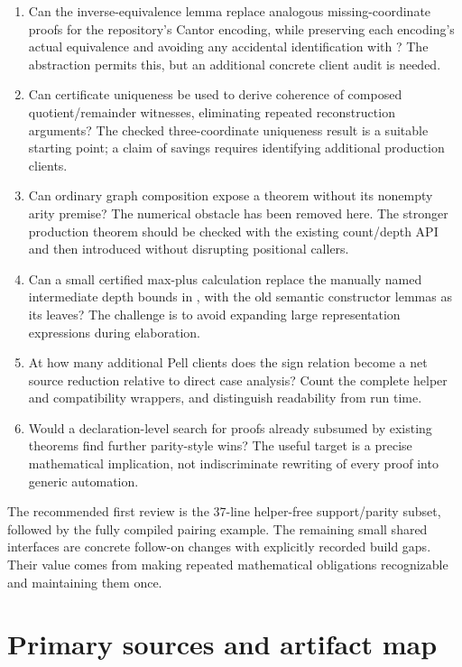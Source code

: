 \documentclass[11pt,letterpaper]{article}
\newcommand{\code}[1]{\texttt{\detokenize{#1}}}
\begin{document}
\begin{enumerate}
\item Can the inverse-equivalence lemma replace analogous missing-coordinate
proofs for the repository's Cantor encoding, while preserving each encoding's
actual equivalence and avoiding any accidental identification with
\code{Nat.pair}? The abstraction permits this, but an additional concrete
client audit is needed.
\item Can certificate uniqueness be used to derive coherence of composed
quotient/remainder witnesses, eliminating repeated reconstruction arguments?
The checked three-coordinate uniqueness result is a suitable starting point;
a claim of savings requires identifying additional production clients.
\item Can ordinary graph composition expose a theorem without its nonempty
arity premise? The numerical obstacle has been removed here. The stronger
production theorem should be checked with the existing count/depth API and
then introduced without disrupting positional callers.
\item Can a small certified max-plus calculation replace the manually named
intermediate depth bounds in \code{BoundedForallDepth}, with the old semantic
constructor lemmas as its leaves? The challenge is to avoid expanding large
representation expressions during elaboration.
\item At how many additional Pell clients does the sign relation become a
net source reduction relative to direct case analysis? Count the complete
helper and compatibility wrappers, and distinguish readability from run time.
\item Would a declaration-level search for proofs already subsumed by existing
theorems find further parity-style wins? The useful target is a precise
mathematical implication, not indiscriminate rewriting of every proof into
generic automation.
\end{enumerate}

The recommended first review is the 37-line helper-free support/parity subset,
followed by the fully compiled pairing example. The remaining small shared
interfaces are concrete follow-on changes with explicitly recorded build
gaps. Their value comes from making repeated mathematical obligations
recognizable and maintaining them once.

\section*{Primary sources and artifact map}
\end{document}
